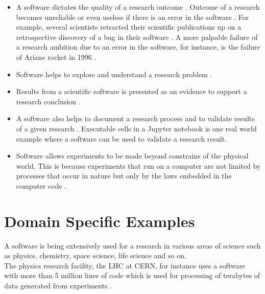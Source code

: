 \begin{itemize}%
	\itemsep0em
	\item A software dictates the quality of a research outcome \citep{hannay2009scientists}. Outcome of a research becomes unreliable or even useless if there is an error in the software \citep{soergel2014rampant}. For example, several scientists retracted their scientific publications up on a retrospective discovery of a bug in their software \citep{wilson2014best,merali2010computational,miller2006scientist}. A more palpable failure of a research ambition due to an error in the software, for instance, is the failure of Ariane rocket in 1996 \citep{garfinkel2005history}.  
	\item Software helps to explore and understand a research problem \citep{hannay2009scientists}.
	\item Results from a scientific software is presented as an evidence to support a research conclusion \citep{kanewala2014testing}. 
	
  
	
	\item A software also helps to document a research process and to validate results of a given research \citep{jay2020software}. Executable cells in a Jupyter notebook is one real world example where a software can be used to validate a research result.
	
	\item Software allows experiments to be made beyond constrains of the physical world. This is because experiments that run on a computer are not limited by processes that occur in nature but only by the laws embedded in the computer code \citep{wolfram1984computer}. 

\end{itemize}

\section{Domain Specific Examples}
\label{sec:Roles:Domain}

A software is being extensively used for a research in various areas of science such as physics, chemistry, space science, life science and so on.\\

The physics research facility, the \ac{LHC} at \ac{CERN}, for instance uses a software with more than 5 million lines of code which is used for processing of terabytes of data generated from experiments \citep{storer2017bridging}.\\

